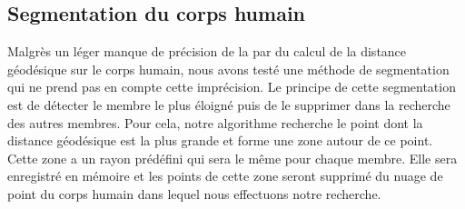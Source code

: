 \subsection{Segmentation du corps humain}
Malgrès un léger manque de précision de la par du calcul de la distance géodésique sur le corps humain, nous avons testé une
méthode de segmentation qui ne prend pas en compte cette imprécision. Le principe de cette segmentation est de détecter le
membre le plus éloigné puis de le supprimer dans la recherche des autres membres. Pour cela, notre algorithme recherche le point
dont la distance géodésique est la plus grande et forme une zone autour de ce point. Cette zone a un rayon prédéfini qui sera le 
même pour chaque membre. Elle sera enregistré en mémoire et les points de cette zone seront supprimé du nuage de point du corps humain dans
lequel nous effectuons notre recherche.\\

